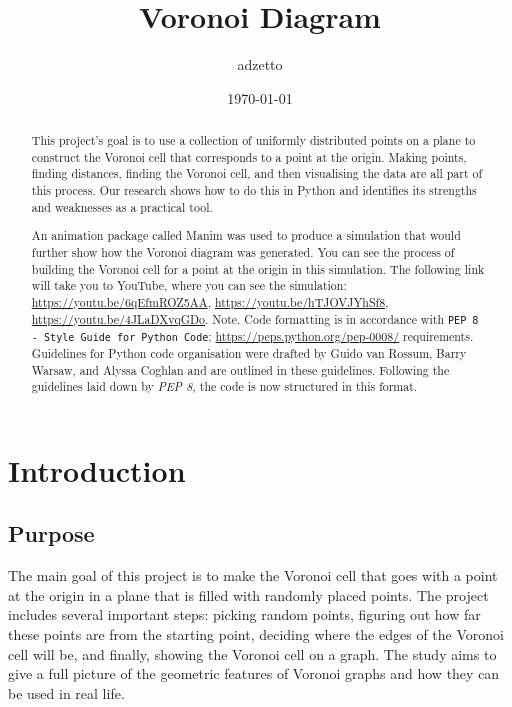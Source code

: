 \documentclass[12pt,a4paper]{report}
\title{Voronoi Diagram}
\author{adzetto}
\date{\today}
\begin{document}
\maketitle

\begin{abstract}
    This project's goal is to use a collection of uniformly distributed points on a plane to construct the Voronoi cell that corresponds to a point at the origin. Making points, finding distances, finding the Voronoi cell, and then visualising the data are all part of this process. Our research shows how to do this in Python and identifies its strengths and weaknesses as a practical tool.

    \vfill
    An animation package called Manim was used to produce a simulation that would further show how the Voronoi diagram was generated. You can see the process of building the Voronoi cell for a point at the origin in this simulation. The following link will take you to YouTube, where you can see the simulation: \url{https://youtu.be/6qEfmROZ5AA}, \url{https://youtu.be/hTJOVJYhSf8}, \url{https://youtu.be/4JLaDXvqGDo}.
    \vfill
    Note. Code formatting is in accordance with \texttt{PEP 8 - Style Guide for Python Code}; \url{https://peps.python.org/pep-0008/} requirements. Guidelines for Python code organisation were drafted by Guido van Rossum, Barry Warsaw, and Alyssa Coghlan and are outlined in these guidelines. Following the guidelines laid down by \textit{PEP 8,} the code is now structured in this format.
\end{abstract}

\tableofcontents

\chapter{Introduction}

\section{Purpose}
The main goal of this project is to make the Voronoi cell that goes with a point at the origin in a plane that is filled with randomly placed points. The project includes several important steps: picking random points, figuring out how far these points are from the starting point, deciding where the edges of the Voronoi cell will be, and finally, showing the Voronoi cell on a graph. The study aims to give a full picture of the geometric features of Voronoi graphs and how they can be used in real life.
\end{document}
